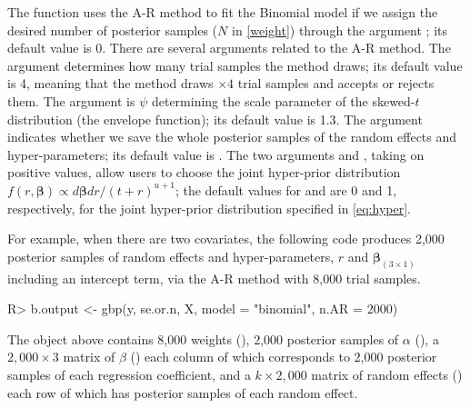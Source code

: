 \documentclass[article]{jss}
\begin{document}
The function  uses the A-R method to fit the Binomial model if we assign the desired number of posterior samples ($N$ in  \eqref{weight}) through the argument ; its default value is 0. There are several arguments related to the A-R method. The argument  determines how many trial samples the method draws; its default value is 4, meaning that the method draws  $\times4$ trial samples and accepts or rejects them. The argument  is $\psi$ determining the scale parameter of the skewed-$t$ distribution (the envelope function); its default value is 1.3. The argument  indicates whether we save the whole posterior samples of the random effects and hyper-parameters; its default value is . The two arguments  and , taking on positive values, allow users to choose the joint hyper-prior distribution $f(r, \boldsymbol{\beta})\propto d\boldsymbol{\beta}dr/(t+r)^{u+1}$; the default values for  and  are 0 and 1, respectively, for the joint hyper-prior distribution specified in  \eqref{eq:hyper}. 

For example, when there are two covariates, the following code produces 2,000 posterior samples of random effects and hyper-parameters, $r$ and $\boldsymbol{\beta}_{(3\times1)}$ including an intercept term, via the A-R method with 8,000 trial samples.
\begin{CodeChunk}
\begin{CodeInput}
R> b.output <- gbp(y, se.or.n, X, model = "binomial", n.AR = 2000)
\end{CodeInput}
\end{CodeChunk}

The object  above contains 8,000 weights (), 2,000 posterior samples of $\alpha$ (), a $2,000\times3$ matrix of $\beta$ ()  each column of which corresponds to 2,000 posterior samples of each regression coefficient, and a $k\times2,000$ matrix of random effects () each row of which has posterior samples of each random effect.


\end{document}
